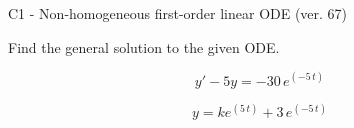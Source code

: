 \begin{exercise}
  \begin{exerciseTitle}C1 - Non-homogeneous first-order linear ODE (ver. 67)\end{exerciseTitle}
  \begin{exerciseStatement}
    
Find the general solution to the given ODE.

    
\[y'-5y= -30 \, e^{\left(-5 \, t\right)}\]

  \end{exerciseStatement}
  \begin{exerciseAnswer}
    
\[y= k e^{\left(5 \, t\right)} + 3 \, e^{\left(-5 \, t\right)}\]

  \end{exerciseAnswer}
\end{exercise}